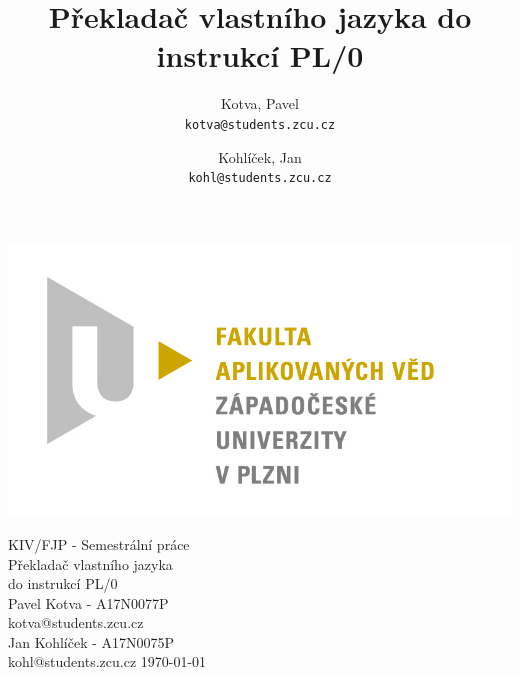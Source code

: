 \documentclass[12pt]{report}
\title{Překladač vlastního jazyka do instrukcí PL/0}
\author{
  Kotva, Pavel\\
  \texttt{kotva@students.zcu.cz}
  \and
  Kohlíček, Jan\\
  \texttt{kohl@students.zcu.cz}
}
\begin{document}
\begin{titlepage}
\begin{flushleft} 
{\includegraphics[width=.5\textwidth]{./img/fav_logo.jpg}\\[3cm]}
\end{flushleft}
\begin{center}

{\Large KIV/FJP - Semestrální práce}\\
\vspace{0.3cm}
{\Huge Překladač vlastního jazyka\\do instrukcí PL/0}\\
\vspace{1cm}
{\large Pavel Kotva - A17N0077P}\\
\vspace{0.1cm}
{\normalsize kotva@students.zcu.cz}\\
\vspace{0.7cm}
{\large Jan Kohlíček - A17N0075P}\\
\vspace{0.1cm}
{\normalsize kohl@students.zcu.cz}
\vfill
{\large \today}
\end{center}
\end{titlepage}

\tableofcontents
\thispagestyle{empty}
\end{document}
